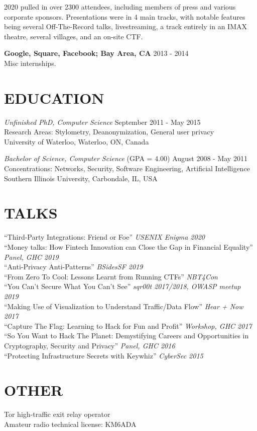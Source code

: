 \documentclass[line,margin]{res}
\begin{document}
\begin{resume}
2020 pulled in over 2300 attendees, including members of press and various corporate sponsors. Presentations were in 4 main tracks, with notable features being several Off-The-Record talks, livestreaming, a track entirely in an IMAX theatre, several villages, and an on-site CTF.

{\bf Google, Square, Facebook; Bay Area, CA}  \hfill {2013 - 2014} \\
Misc internships.

\section{EDUCATION} 
{\sl Unfinished PhD, Computer Science} \hfill {September 2011 - May 2015} \\
Research Areas: Stylometry, Deanonymization, General user privacy\\
University of Waterloo, Waterloo, ON, Canada

{\sl Bachelor of Science, Computer Science} (GPA = 4.00) \hfill {August 2008 - May 2011}\\
Concentrations: Networks, Security, Software Engineering, Artificial Intelligence\\
Southern Illinois University, Carbondale, IL, USA

\section{TALKS}
``Third-Party Integrations: Friend or Foe'' {\sl USENIX Enigma 2020}\\
``Money talks: How Fintech Innovation can Close the Gap in Financial Equality'' {\sl Panel, GHC 2019}\\
``Anti-Privacy Anti-Patterns'' {\sl BSidesSF 2019}\\
``From Zero To Cool: Lessons Learnt from Running CTFs'' {\sl NBT4Con}\\
``You Can't Secure What You Can't See'' {\sl sqr00t 2017/2018, OWASP meetup 2019}\\
``Making Use of Visualization to Understand Traffic/Data Flow'' {\sl Hear + Now 2017}\\
``Capture The Flag: Learning to Hack for Fun and Profit'' {\sl Workshop, GHC 2017}\\
``So You Want to Hack The Planet: Demystifying Careers and Opportunities in Cryptography, Security and Privacy'' {\sl Panel, GHC 2016}\\
``Protecting Infrastructure Secrets with Keywhiz'' {\sl CyberSec 2015}

\section{OTHER}
Tor high-traffic exit relay operator\\
Amateur radio technical license: KM6ADA\\

\end{resume}
\end{document}
